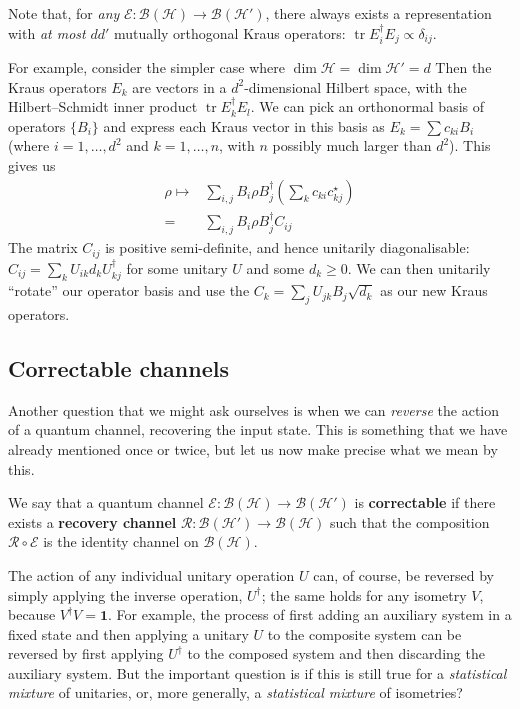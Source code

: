 \documentclass[fleqn,a4paper]{article}
\newenvironment{idea}{\everypar{\setlength{\parindent}{1.5em}}}{}
\theoremstyle{definition}
\theoremstyle{definition}
\theoremstyle{definition}
\theoremstyle{definition}
\theoremstyle{remark}
\begin{document}
Note that, for \emph{any} \(\mathcal{E}\colon\mathcal{B}(\mathcal{H})\to\mathcal{B}(\mathcal{H}')\), there always exists a representation with \emph{at most} \(dd'\) mutually orthogonal Kraus operators: \(\operatorname{tr}E^\dagger_iE_j\propto\delta_{ij}\).

For example, consider the simpler case where \(\dim\mathcal{H}=\dim\mathcal{H}'=d\)
Then the Kraus operators \(E_k\) are vectors in a \(d^2\)-dimensional Hilbert space, with the Hilbert--Schmidt inner product \(\operatorname{tr}E^\dagger_k E_l\).
We can pick an orthonormal basis of operators \(\{B_i\}\) and express each Kraus vector in this basis as \(E_k=\sum c_{ki} B_i\) (where \(i=1,\ldots,d^2\) and \(k=1,\ldots,n\), with \(n\) possibly much larger than \(d^2\)).
This gives us
\[
  \begin{aligned}
    \rho
    \longmapsto
    & \sum_{i,j} B_i\rho B^\dagger_j \left(\sum _k c_{ki}c^\star_{kj}\right)
  \\=& \sum_{i,j} B_i\rho B^\dagger_j  C_{ij}
  \end{aligned}
\]
The matrix \(C_{ij}\) is positive semi-definite, and hence unitarily diagonalisable: \(C_{ij}=\sum_k U_{ik} d_k U^\dagger_{kj}\) for some unitary \(U\) and some \(d_k\geqslant 0\).
We can then unitarily ``rotate'' our operator basis and use the \(C_k=\sum_j U_{jk}B_j \sqrt{d_k}\) as our new Kraus operators.

\hypertarget{correctable-channels}{%
\subsection{Correctable channels}\label{correctable-channels}}

Another question that we might ask ourselves is when we can \emph{reverse} the action of a quantum channel, recovering the input state.
This is something that we have already mentioned once or twice, but let us now make precise what we mean by this.

\begin{idea}
We say that a quantum channel \(\mathcal{E}\colon\mathcal{B}(\mathcal{H})\to\mathcal{B}(\mathcal{H}')\) is \textbf{correctable} if there exists a \textbf{recovery channel} \(\mathcal{R}\colon\mathcal{B}(\mathcal{H}')\to\mathcal{B}(\mathcal{H})\) such that the composition \(\mathcal{R}\circ\mathcal{E}\) is the identity channel on \(\mathcal{B}(\mathcal{H})\).

\end{idea}

The action of any individual unitary operation \(U\) can, of course, be reversed by simply applying the inverse operation, \(U^\dagger\);
the same holds for any isometry \(V\), because \(V^\dagger V=\mathbf{1}\).
For example, the process of first adding an auxiliary system in a fixed state and then applying a unitary \(U\) to the composite system can be reversed by first applying \(U^\dagger\) to the composed system and then discarding the auxiliary system.
But the important question is if this is still true for a \emph{statistical mixture} of unitaries, or, more generally, a \emph{statistical mixture} of isometries?
\end{document}
